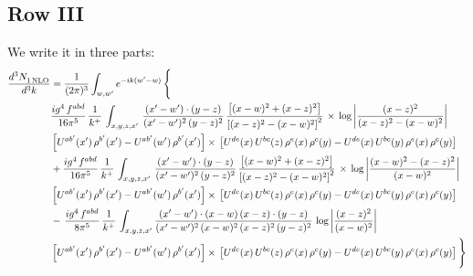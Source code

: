 \documentclass[9pt]{article}
\numberwithin{equation}{section}
\begin{document}
\subsection{Row III}
We write it in three parts:
\begin{align}
   \frac{d^{3}N_{1\,\rm NLO}^{\rm}}{d^{3}k}  & =  \frac{1}{(2\pi)^{3}}  \int_{w, w^\prime} e^{-ik(w^\prime-w)}\, \Bigg\{\notag \\
& \frac{ig^{4}\,f^{abd}}{16\pi^{5}}\, \frac{1}{k^{+}}\,\int_{x,y,z,x'}\, \frac{(x'-w')\cdot (y-z)}{(x'-w')^{2}\,(y-z)^{2}}\, \frac{\left[(x-w)^{2}+(x-z)^{2}\right]}{\left[(x-z)^{2}-(x-w)^{2}\right]^{2}}\, \times\, \log{\left|\frac{(x-z)^{2}}{(x-z)^{2}-(x-w)^{2}}\right|}\notag \\ & \left[U^{ab'}(x')\,\rho^{b'}(x')-U^{ab'}(w')\, \rho^{b'}(x')\right]\times\, \left[U^{de}(x)\,U^{bc}(z)\, \rho^{e}(x)\,\rho^{c}(y)-U^{de}(x)\,U^{bc}(y)\,\rho^{e}(x)\,\rho^{c}(y)\right] \notag \\
&  +\frac{ig^{4}\,f^{abd}}{16\pi^{5}}\, \frac{1}{k^{+}}\,\int_{x,y,z,x'}\, \frac{(x'-w')\cdot (y-z)}{(x'-w')^{2}\,(y-z)^{2}}\, \frac{\left[(x-w)^{2}+(x-z)^{2}\right]}{\left[(x-z)^{2}-(x-w)^{2}\right]^{2}}\, \times\, \log{\left|\frac{(x-w)^{2}-(x-z)^{2}}{(x-w)^{2}}\right|}\notag \\ & \left[U^{ab'}(x')\,\rho^{b'}(x')-U^{ab'}(w')\, \rho^{b'}(x')\right]\times\, \left[U^{de}(x)\,U^{bc}(z)\, \rho^{e}(x)\,\rho^{c}(y)-U^{de}(x)\,U^{bc}(y)\,\rho^{e}(x)\,\rho^{c}(y)\right] \notag \\
&-\, \frac{ig^{4}\,f^{abd}}{8\pi^{5}}\,\frac{1}{k^{+}}\,\int_{x,y,z,x'}\frac{(x'-w')\cdot (x-w)\, (x-z)\cdot (y-z)}{(x'-w')^{2}\, (x-w)^{2}\, (x-z)^{2}\, (y-z)^{2}}\,\log{\left|\frac{(x-z)^{2}}{(x-w)^{2}}\right|} \notag \\ & \left[U^{ab'}(x')\,\rho^{b'}(x')-U^{ab'}(w')\, \rho^{b'}(x')\right]\times\, \left[U^{de}(x)\,U^{bc}(z)\, \rho^{e}(x)\,\rho^{c}(y)-U^{de}(x)\,U^{bc}(y)\,\rho^{e}(x)\,\rho^{c}(y)\right]\Bigg\}
\end{align}
\end{document}
